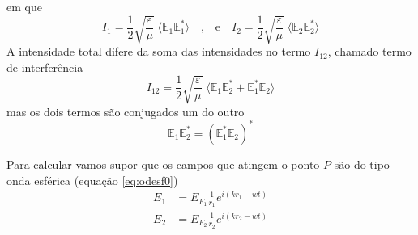 \documentclass[a4paper,12pt]{article}
\begin{document}
em que 
\begin{equation}
	\label{eq:10} I_1 =\frac{1}{2}\sqrt{\frac{ \varepsilon}{\mu}} \;  \langle \mathbb{E}_{1} \mathbb{E}^*_{1} \rangle \quad \text{,} \quad \text{e} \quad  I_2 =\frac{1}{2}\sqrt{\frac{ \varepsilon}{\mu}} \; \langle \mathbb{E}_2 \mathbb{E}^*_2 \rangle
\end{equation}
A intensidade total difere da soma das intensidades no termo $I_{12} $, chamado termo de interferência 
\begin{equation}
	\label{eq:11} I_{12} =\frac{1}{2}\sqrt{\frac{ \varepsilon}{\mu}} \; \langle \mathbb{E}_1 \mathbb{E}^*_2 + \mathbb{E}^*_1 \mathbb{E}_2 \rangle 
\end{equation}
mas os dois termos são conjugados um do outro 
\begin{equation}
	\label{eq:12} \mathbb{E}_1 \mathbb{E}^*_2 = (\mathbb{E}^*_1 \mathbb{E}_2)^* 
\end{equation}

Para calcular vamos supor que os campos que atingem o ponto $P$ são do tipo onda esférica (equação \ref{eq:odesf0}) 
\begin{align}
	E_1 &= E_{F_1} \frac{1}{r_1} e^{ i (k r_1 -wt )} \label{eq:odesf}\\
	E_2 &= E_{F_2} \frac{1}{r_2} e^{ i (k r_2 -wt )} \label{eq:odesf1} 
\end{align}
\end{document}
